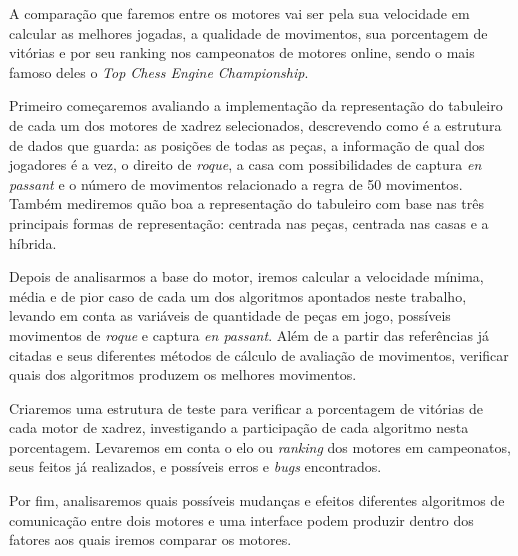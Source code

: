 A comparação que faremos entre os motores vai ser pela sua velocidade em calcular as melhores jogadas, a qualidade de movimentos,
sua porcentagem de vitórias e por seu ranking nos campeonatos de motores online, sendo o mais famoso deles o \textit{Top Chess Engine Championship}.

Primeiro começaremos avaliando a implementação da representação do tabuleiro de cada um dos motores de xadrez selecionados,
descrevendo como é a estrutura de dados que guarda: as posições de todas as peças, a informação de qual dos jogadores
é a vez, o direito de \textit{roque}, a casa com possibilidades de captura \textit{en passant} e o número de movimentos relacionado
a regra de 50 movimentos. Também mediremos quão boa a representação do tabuleiro com base nas três principais
formas de representação: centrada nas peças, centrada nas casas e a híbrida.


Depois de analisarmos a base do motor, iremos calcular a velocidade mínima, média e de pior caso de cada um dos algoritmos
apontados neste trabalho, levando em conta as variáveis de quantidade de peças em jogo, possíveis movimentos de \textit{roque}
e captura \textit{en passant}. Além de a partir das referências já citadas e seus diferentes métodos de cálculo de avaliação
de movimentos, verificar quais dos algoritmos produzem os melhores movimentos.

Criaremos uma estrutura de teste para verificar a porcentagem de vitórias de cada motor de xadrez, investigando
a participação de cada algoritmo nesta porcentagem. Levaremos em conta o elo ou \textit{ranking} dos motores em campeonatos,
seus feitos já realizados, e possíveis erros e \textit{bugs} encontrados.

Por fim, analisaremos quais possíveis mudanças e efeitos diferentes algoritmos de comunicação entre dois motores
e uma interface podem produzir dentro dos fatores aos quais iremos comparar os motores.
